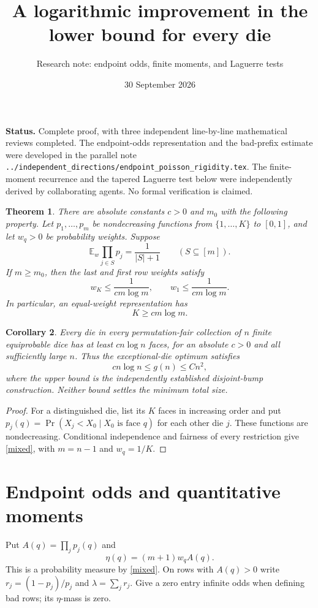 \documentclass[11pt]{article}
\title{A logarithmic improvement in the lower bound for every die}
\author{Research note: endpoint odds, finite moments, and Laguerre tests}
\date{30 September 2026}
\newtheorem{theorem}{Theorem}
\newtheorem{corollary}[theorem]{Corollary}
\newcommand{\E}{\mathbb E}
\begin{document}
\maketitle
\noindent\textbf{Status.} Complete proof, with three independent line-by-line mathematical
reviews completed. The endpoint-odds representation and the bad-prefix
estimate were developed in the parallel note
\texttt{../independent\_directions/endpoint\_poisson\_rigidity.tex}.
The finite-moment recurrence and the tapered Laguerre test below were
independently derived by collaborating agents. No formal verification is
claimed.

\begin{theorem}\label{main}
There are absolute constants $c>0$ and $m_0$ with the following property.
Let $p_1,\ldots,p_m$ be nondecreasing functions from
$\{1,\ldots,K\}$ to $[0,1]$, and let $w_q>0$ be probability weights.
Suppose
\begin{equation}\label{mixed}
 \E_w\prod_{j\in S}p_j=\frac1{|S|+1}
 \qquad(S\subseteq[m]).
\end{equation}
If $m\ge m_0$, then the last and first row weights satisfy
\[
 w_K\le\frac1{c m\log m},\qquad
 w_1\le\frac1{c m\log m}.
\]
In particular, an equal-weight representation has
\[
 K\ge c m\log m.
\]
\end{theorem}

\begin{corollary}\label{dice}
Every die in every permutation-fair collection of $n$ finite equiprobable
dice has at least $c n\log n$ faces, for an absolute $c>0$ and all
sufficiently large $n$. Thus the exceptional-die optimum satisfies
\[
 c n\log n\le g(n)\le Cn^2,
\]
where the upper bound is the independently established disjoint-bump
construction. Neither bound settles the minimum total size.
\end{corollary}
\begin{proof}
For a distinguished die, list its $K$ faces in increasing order and put
$p_j(q)=\Pr(X_j<X_0\mid X_0\text{ is face }q)$ for each other die $j$.
These functions are nondecreasing. Conditional independence and fairness
of every restriction give \eqref{mixed}, with $m=n-1$ and $w_q=1/K$.
\end{proof}

\section*{Endpoint odds and quantitative moments}
Put $A(q)=\prod_jp_j(q)$ and
\[
 \eta(q)=(m+1)w_q A(q).
\]
This is a probability measure by \eqref{mixed}. On rows with $A(q)>0$
write $r_j=(1-p_j)/p_j$ and $\lambda=\sum_jr_j$. Give a zero entry
infinite odds when defining bad rows; its $\eta$-mass is zero.
\end{document}

